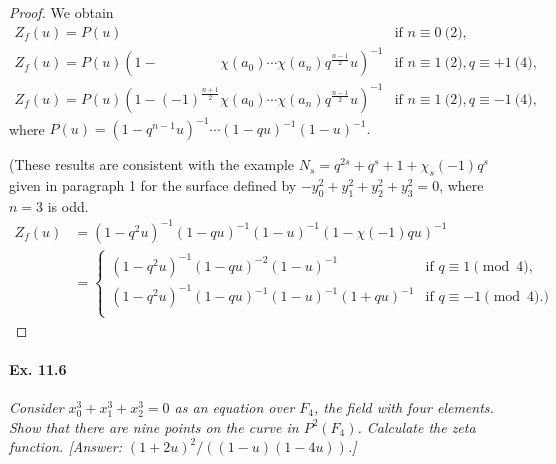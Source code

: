 \documentclass[11pt,a4paper]{article}
\begin{document}
\begin{proof}
We obtain
$$
\begin{array}{ll}
Z_f(u) = P(u)&\text{if  } n\equiv 0 \pod 2,\\
Z_f(u) = P(u)(1 - \phantom{ (-1)^\frac{n+1}{2}}\chi(a_0)\cdots \chi(a_n) q^\frac{n-1}{2}u)^{-1}&\text{if } n \equiv 1 \pod 2, q \equiv +1 \pod 4,\\
Z_f(u) = P(u)(1 - (-1)^\frac{n+1}{2}\chi(a_0)\cdots \chi(a_n) q^\frac{n-1}{2}u)^{-1}& \text{if }n \equiv 1 \pod 2, q \equiv -1 \pod 4,
\end{array}
$$
where $P(u) =  (1-q^{n-1}u)^{-1}\cdots (1-qu)^{-1}(1-u)^{-1}.$

(These results are consistent with the example $N_s = q^{2s} + q^s + 1 +\chi_s(-1) q^s$ given in paragraph 1 for the surface defined by $-y_0^2 + y_1^2 + y_2^2 + y_3^2 =0$, where $n=3$ is odd.
\begin{align*}
Z_f(u) &= (1-q^2u)^{-1}(1-qu)^{-1}(1-u)^{-1} (1 - \chi(-1) qu)^{-1}\\
&=
\left\{
\begin{array}{ll}
(1-q^2u)^{-1}(1-qu)^{-2}(1-u)^{-1}  & \text{if } q \equiv 1 \pmod 4,\\
(1-q^2u)^{-1}(1-qu)^{-1}(1-u)^{-1}(1+qu)^{-1} & \text{if } q \equiv -1 \pmod 4.)\\
\end{array}
\right.
\end{align*}
\end{proof}


\paragraph{Ex. 11.6}{\it Consider $x_0^3 + x_1^3 + x_2^3 = 0$ as an equation over $F_4$, the field with four elements. Show that there are nine points on the curve in $P^2(F_4)$. Calculate the zeta function. [Answer: $(1+2u)^2/((1-u)(1-4u))$.]
}
\end{document}

